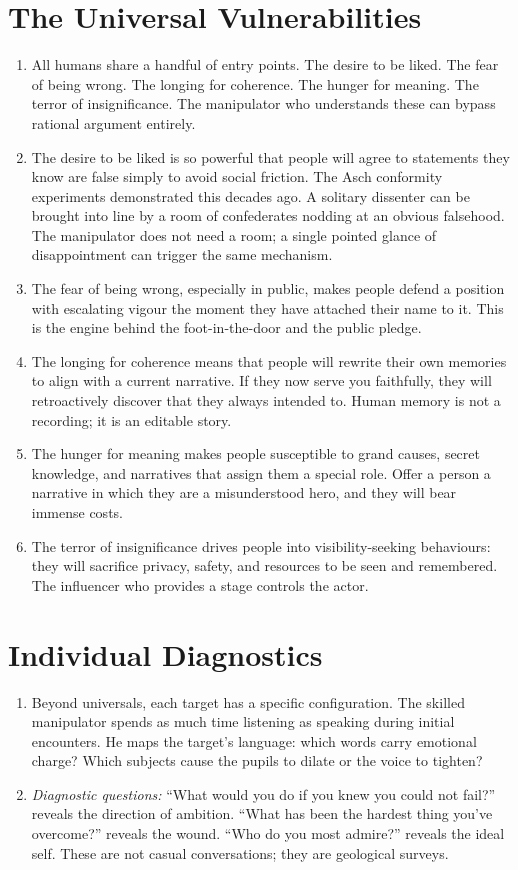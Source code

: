\documentclass[12pt,a4paper,oneside]{book}
\begin{document}
\section{The Universal Vulnerabilities}
\begin{enumerate}[leftmargin=*, label=\arabic*.]
\item All humans share a handful of entry points. The desire to be liked. The fear of being wrong. The longing for coherence. The hunger for meaning. The terror of insignificance. The manipulator who understands these can bypass rational argument entirely.
\item The desire to be liked is so powerful that people will agree to statements they know are false simply to avoid social friction. The Asch conformity experiments demonstrated this decades ago. A solitary dissenter can be brought into line by a room of confederates nodding at an obvious falsehood. The manipulator does not need a room; a single pointed glance of disappointment can trigger the same mechanism.
\item The fear of being wrong, especially in public, makes people defend a position with escalating vigour the moment they have attached their name to it. This is the engine behind the foot-in-the-door and the public pledge.
\item The longing for coherence means that people will rewrite their own memories to align with a current narrative. If they now serve you faithfully, they will retroactively discover that they always intended to. Human memory is not a recording; it is an editable story.
\item The hunger for meaning makes people susceptible to grand causes, secret knowledge, and narratives that assign them a special role. Offer a person a narrative in which they are a misunderstood hero, and they will bear immense costs.
\item The terror of insignificance drives people into visibility-seeking behaviours: they will sacrifice privacy, safety, and resources to be seen and remembered. The influencer who provides a stage controls the actor.
\end{enumerate}

\section{Individual Diagnostics}
\begin{enumerate}[leftmargin=*, label=\arabic*.]
\item Beyond universals, each target has a specific configuration. The skilled manipulator spends as much time listening as speaking during initial encounters. He maps the target's language: which words carry emotional charge? Which subjects cause the pupils to dilate or the voice to tighten?
\item \textit{Diagnostic questions:} “What would you do if you knew you could not fail?” reveals the direction of ambition. “What has been the hardest thing you've overcome?” reveals the wound. “Who do you most admire?” reveals the ideal self. These are not casual conversations; they are geological surveys.
\end{enumerate}
\end{document}
